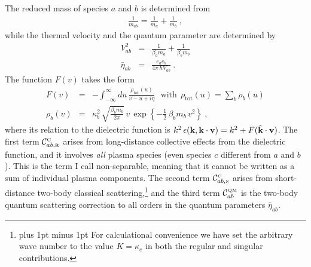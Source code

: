 \documentclass[preprint,12pt,eqsecnum,nofootinbib,amsmath,amssymb]{revtex4}
\newcommand{\smC}{{\rm\scriptscriptstyle C}}
\newcommand{\smR}{{\rm\scriptscriptstyle R}}
\newcommand{\smS}{{\rm\scriptscriptstyle S}}
\newcommand{\smQM}{{\rm\scriptscriptstyle QM}}
\newcommand{\footnoteskip}{\baselineskip 12pt plus 1pt minus 1pt}
\begin{document}
 The reduced mass of species $a$ and $b$ is determined from
\begin{eqnarray}
  \frac{1}{m_{ab}} = \frac{1}{m_a} + \frac{1}{m_b} \ ,
\end{eqnarray}
while the thermal velocity and the quantum parameter are determined by
\begin{eqnarray}
  V_{ab}^2 &=& \frac{1}{\beta_a m_a} + \frac{1}{\beta_b m_b}
\\[5pt]
 \bar\eta_{ab}&=& \frac{e_a e_b}{4\pi\, \hbar V_{ab}} \ .
\end{eqnarray}
The function $F(v)$ takes the form
\begin{eqnarray}
  F(v) 
  &=& 
  -\int_{-\infty}^\infty \! du \, 
  \frac{\rho_\text{tot}(u)}{v - u + i\eta} 
  ~~~\text{with}~~
  \rho_\text{tot}(u)=\sum_b\rho_b(u)
\label{Fdef}
\\[5pt]
  \rho_b(v) 
  &=& 
  \kappa_b^2\,\sqrt{\frac{\beta_b m_b}{2\pi}}\, v\,
  \exp\!\left\{-\frac{1}{2}\,\beta_b m_b\, v^2\right\} \ ,
\label{rhototdef}
\end{eqnarray}
\noindent
where its relation to the dielectric function is $k^2 \, \epsilon(
{\bf k} , {\bf k}\cdot {\bf v} ) = k^2 + F(\hat{\bf k} \cdot {\bf
v})$. The first term ${\cal C}_{ab ,\smR}^\smC$ arises from long-distance
collective effects from the dielectric function, and it involves {\em
  all} plasma species (even species $c$ different from $a$ and $b$).
This is the term I call non-separable, meaning that it cannot be
written as a sum of individual plasma components. The second term
${\cal C}_{ab ,\smS}^\smC$ arises from short-distance two-body
classical scattering,\footnote{\footnoteskip
  For calculational convenience we have set the arbitrary wave number
  to the value $K=\kappa_e$ in both the regular and singular
  contributions.
}  
and the third term ${\cal C}_{ab}^\smQM$ is the two-body quantum
scattering correction to all orders in the quantum parameters
$\bar\eta_{ab}$. 
\end{document}

